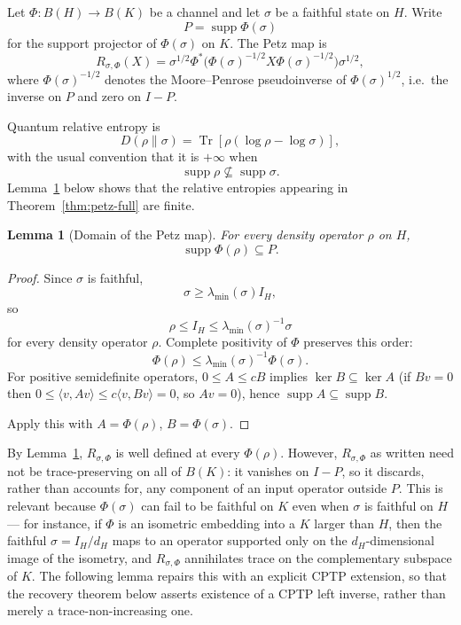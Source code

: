 \documentclass[11pt]{article}
\newtheorem{lemma}[theorem]{Lemma}
\DeclareMathOperator{\Tr}{Tr}
\DeclareMathOperator{\supp}{supp}
\begin{document}
Let $\Phi:B(H)\to B(K)$ be a channel and let $\sigma$ be a faithful state
on $H$. Write
\[
P=\supp\Phi(\sigma)
\]
for the support projector of $\Phi(\sigma)$ on $K$. The Petz map is
\[
R_{\sigma,\Phi}(X)
=
\sigma^{1/2}
\Phi^*\bigl(\Phi(\sigma)^{-1/2}X\Phi(\sigma)^{-1/2}\bigr)
\sigma^{1/2},
\]
where $\Phi(\sigma)^{-1/2}$ denotes the Moore--Penrose pseudoinverse of
$\Phi(\sigma)^{1/2}$, i.e.\ the inverse on $P$ and zero on $I-P$.

Quantum relative entropy is
\[
D(\rho\|\sigma)=\Tr[\rho(\log\rho-\log\sigma)],
\]
with the usual convention that it is $+\infty$ when
\[
\supp\rho\not\subseteq\supp\sigma.
\]
Lemma~\ref{lem:petz-domain} below shows that the relative entropies
appearing in Theorem~\ref{thm:petz-full} are finite.

\begin{lemma}[Domain of the Petz map]
\label{lem:petz-domain}
For every density operator $\rho$ on $H$,
\[
\supp\Phi(\rho)\subseteq P.
\]
\end{lemma}

\begin{proof}
Since $\sigma$ is faithful,
\[
\sigma\ge\lambda_{\min}(\sigma)I_H,
\]
so
\[
\rho\le I_H\le\lambda_{\min}(\sigma)^{-1}\sigma
\]
for every density operator $\rho$. Complete positivity of $\Phi$ preserves
this order:
\[
\Phi(\rho)\le\lambda_{\min}(\sigma)^{-1}\Phi(\sigma).
\]
For positive semidefinite operators, $0\le A\le cB$ implies
$\ker B\subseteq\ker A$ (if $Bv=0$ then
$0\le\langle v,Av\rangle\le c\langle v,Bv\rangle=0$, so $Av=0$), hence
$\supp A\subseteq\supp B$.

Apply this with $A=\Phi(\rho)$, $B=\Phi(\sigma)$.
\end{proof}

By Lemma~\ref{lem:petz-domain}, $R_{\sigma,\Phi}$ is well defined at every
$\Phi(\rho)$. However, $R_{\sigma,\Phi}$ as written need not be
trace-preserving on all of $B(K)$: it vanishes on $I-P$, so it discards,
rather than accounts for, any component of an input operator outside $P$.
This is relevant because $\Phi(\sigma)$ can fail to be faithful on $K$ even
when $\sigma$ is faithful on $H$ --- for instance, if $\Phi$ is an
isometric embedding into a $K$ larger than $H$, then the faithful
$\sigma=I_H/d_H$ maps to an operator supported only on the
$d_H$-dimensional image of the isometry, and $R_{\sigma,\Phi}$ annihilates
trace on the complementary subspace of $K$. The following lemma repairs
this with an explicit CPTP extension, so that the recovery theorem below
asserts existence of a CPTP left inverse, rather than merely a
trace-non-increasing one.
\end{document}
